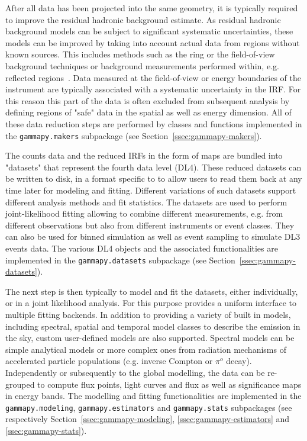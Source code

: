 \documentclass[traditabstract, longauth]{aa}
\newcommand{\code}[1]{\texttt{#1}}
\begin{document}
After all data has been projected into the same geometry, it is typically
required to improve the residual hadronic background estimate. As residual hadronic
background models can be subject to significant systematic uncertainties,
these models can be improved by taking into account actual data
from regions without known \gammaray sources. This includes methods 
such as the ring or the field-of-view background techniques or
background measurements performed within, e.g. reflected regions~\citep{Berge07}.
Data measured at the field-of-view or energy boundaries of the instrument are typically
associated with a systematic uncertainty in the IRF. For this reason this part 
of the data is often excluded from subsequent analysis by defining regions of
 "safe" data in the spatial as well as energy dimension.
All of these data reduction steps are performed by classes and functions
implemented in the \code{gammapy.makers} subpackage (see Section~\ref{ssec:gammapy-makers}).

The counts data and the reduced IRFs in the form of maps are bundled into "datasets"
that represent the fourth data level (DL4). These reduced datasets can be written to disk,
in a format specific to \gammapy to allow users to read them back at any time later
for modeling and fitting. Different variations of such datasets support different 
analysis methods and fit statistics. The datasets are used to perform joint-likelihood
fitting allowing to combine different measurements, e.g. from different observations
but also from different instruments or event classes. They can also be used for binned
simulation as well as event sampling to simulate DL3 events data.
The various DL4 objects and the associated functionalities are
implemented in the \code{gammapy.datasets} subpackage (see Section~\ref{ssec:gammapy-datasets}).

The next step is then typically to model and fit the datasets, either
individually, or in a joint likelihood analysis. For this purpose \gammapy
provides a uniform interface to multiple fitting backends. In addition to
providing a variety of built in models, including spectral,
spatial and temporal model classes to describe the \gammaray emission in the sky,
custom user-defined models are also supported.
Spectral models can be simple analytical models or more complex ones from radiation
mechanisms of accelerated particle populations (e.g. inverse Compton or $\pi^{o}$ decay).
Independently or subsequently to the global modelling, the data can be
re-grouped to compute flux points, light curves and flux as well as significance
maps in energy bands.
The modelling and fitting functionalities are implemented in the \code{gammapy.modeling},
\code{gammapy.estimators} and \code{gammapy.stats} subpackages (see respectively
Section~\ref{ssec:gammapy-modeling}, \ref{ssec:gammapy-estimators} and \ref{ssec:gammapy-stats}).
\end{document}
